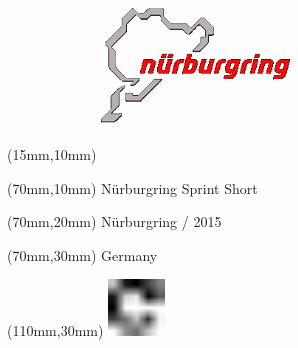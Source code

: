 \null\newpage
\begin{textblock*}{50mm}(15mm,10mm)%
\includegraphics[width=50mm]{LG/NUR.png}
\end{textblock*}
\begin{textblock*}{130mm}(70mm,10mm)%
{\fontsize{20}{20}\selectfont Nürburgring Sprint Short}\\
\end{textblock*}
\begin{textblock*}{120mm}(70mm,20mm)%
{\fontsize{16}{16}\selectfont Nürburgring / 2015}\\
\end{textblock*}
\begin{textblock*}{120mm}(70mm,30mm)%
{\fontsize{12}{12}\selectfont Germany}
\end{textblock*}
\begin{textblock*}{30mm}(110mm,30mm)%
\centering
\includegraphics[height=15mm]{icons/fa-rotate-right.pdf}
\end{textblock*}
